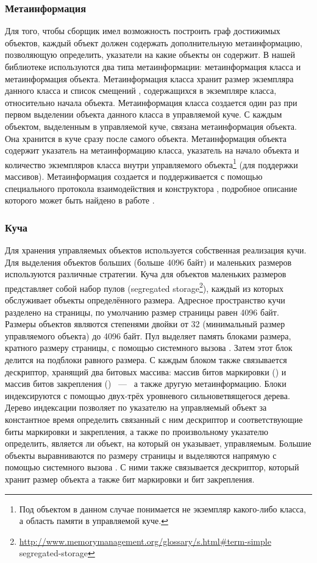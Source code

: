 \subsubsection{Метаинформация}
Для того, чтобы сборщик имел возможность построить граф достижимых объектов, каждый объект 
должен содержать дополнительную метаинформацию, позволяющую определить, указатели на какие 
объекты он содержит. 
В нашей библиотеке используются два типа метаинформации: метаинформация класса и 
метаинформация объекта. 
Метаинформация класса хранит размер экземпляра данного класса и список смещений , 
содержащихся в экземпляре класса, относительно начала объекта. 
Метаинформация класса создается один раз при первом выделении объекта данного класса в 
управляемой куче. 
С каждым объектом, выделенным в управляемой куче, связана метаинформация объекта. 
Она хранится в куче сразу после самого объекта. 
Метаинформация объекта содержит указатель на метаинформацию класса, указатель на начало 
объекта и количество экземпляров класса внутри управляемого 
объекта\footnote{Под объектом в данном случае понимается не экземпляр какого-либо класса, 
а область памяти в управляемой куче.} (для поддержки массивов). 
Метаинформация создается и поддерживается с помощью специального протокола взаимодействия 
 и конструктора , подробное описание которого может быть найдено 
в работе \cite{book:precisegc_secr}.

\subsubsection{Куча}
\label{sec:heap}
Для хранения управляемых объектов используется собственная реализация кучи. 
Для выделения объектов больших (больше 4096 байт) и маленьких размеров используются 
различные стратегии. 
Куча для объектов маленьких размеров представляет собой набор пулов 
(segregated storage\footnote{\url{http://www.memorymanagement.org/glossary/s.html\#term-simple}\\
{segregated-storage}}), 
каждый из которых обслуживает объекты определённого размера. 
Адресное пространство кучи разделено на страницы, по умолчанию размер страницы равен 4096 байт. 
Размеры объектов являются степенями двойки от 32 (минимальный размер управляемого объекта) до 
4096 байт. 
Пул выделяет память блоками размера, кратного размеру страницы, с помощью системного вызова 
. 
Затем этот блок делится на подблоки равного размера. 
С каждым блоком также связывается дескриптор, хранящий два битовых массива:
массив битов маркировки () и массив битов закрепления () ~---~ а также другую метаинформацию. 
Блоки индексируются с помощью двух-трёх уровневого сильноветвящегося дерева. 
Дерево индексации позволяет по указателю на управляемый объект за константное время 
определить связанный с ним дескриптор и соответствующие биты маркировки и закрепления, 
а также по произвольному указателю определить, является ли объект, на который он указывает, 
управляемым. 
Большие объекты выравниваются по размеру страницы и выделяются напрямую с помощью системного 
вызова . 
С ними также связывается дескриптор, который хранит размер объекта а также 
бит маркировки и бит закрепления.

